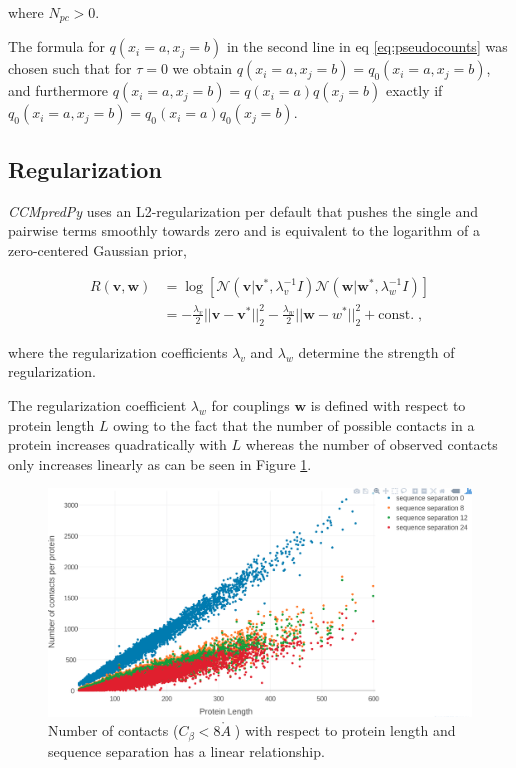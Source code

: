 \documentclass[11pt,a4paper,twoside]{book}
\newcommand{\Cb}{C_\beta}
\newcommand{\eq}{\!=\!}
\renewcommand{\v}{\mathbf{v}}
\newcommand{\w}{\mathbf{w}}
\newcommand{\angstrom}{\mathring{A} \;}
\theoremstyle{definition}
\theoremstyle{definition}
\theoremstyle{remark}
\begin{document}
where \(N_{pc} > 0\).

The formula for \(q(x_i \eq a, x_j \eq b)\) in the second line in eq
\eqref{eq:pseudocounts} was chosen such that for \(\tau \eq0\) we obtain
\(q(x_i \eq a, x_j \eq b) = q_0(x_i \eq a, x_j \eq b)\), and furthermore
\(q(x_i \eq a, x_j \eq b) = q(x_i \eq a) q(x_j \eq b)\) exactly if
\(q_0(x_i \eq a, x_j \eq b) = q_0(x_i \eq a) q_0(x_j \eq b)\).

\subsection{Regularization}\label{methods-regularization}

\emph{CCMpredPy} uses an L2-regularization per default that pushes the
single and pairwise terms smoothly towards zero and is equivalent to the
logarithm of a zero-centered Gaussian prior,

\begin{align}
  R(\v, \w)  &= \log \left[ \mathcal{N}(\v | \v^*, \lambda_v^{-1} I) \mathcal{N}(\w | \w^*, \lambda_w^{-1} I) \right] \nonumber \\
             &= -\frac{\lambda_v}{2} ||\v-\v^*||_2^2 - \frac{\lambda_w}{2} ||\w-w^*||_2^2 + \text{const.} \; ,
\label{eq:l2-reg}
\end{align}

where the regularization coefficients \(\lambda_v\) and \(\lambda_w\)
determine the strength of regularization.

The regularization coefficient \(\lambda_w\) for couplings \(\w\) is
defined with respect to protein length \(L\) owing to the fact that the
number of possible contacts in a protein increases quadratically with
\(L\) whereas the number of observed contacts only increases linearly as
can be seen in Figure \ref{fig:number-contacts-against-L}.





\begin{figure}

{\centering \includegraphics[width=0.9\linewidth]{img/full_likelihood/no_contacts_vs_protein_length_thr8} 

}

\caption{Number of contacts
(\(\Cb < 8 \angstrom\)) with respect to protein length and sequence
separation has a linear relationship.}\label{fig:number-contacts-against-L}
\end{figure}
\end{document}
